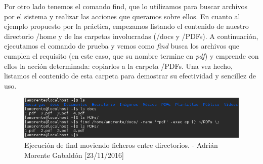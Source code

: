 	Por otro lado tenemos el comando find, que lo utilizamos para buscar archivos por el sistema y realizar las acciones que queramos sobre ellos. En cuanto al ejemplo propuesto por la práctica, empezamos listando el contenido de nuestro directorio /home y de las carpetas involucradas (/docs y /PDFs). A continuación, ejecutamos el comando de prueba y vemos como \emph{find} busca los archivos que cumplen el requisito (en este caso, que su nombre termine en \emph{pdf}) y emprende con ellos la acción determinada: copiarlos a la carpeta /PDFs. Una vez hecho, listamos el contenido de esta carpeta para demostrar su efectividad y sencillez de uso.
	\begin{figure}[H]
		\centering
		\includegraphics[scale=0.75]{find}
		\caption{Ejecución de find moviendo ficheros entre directorios. - Adrián Morente Gabaldón [23/11/2016]}
		\label{fig:figura14}
	\end{figure}
	
